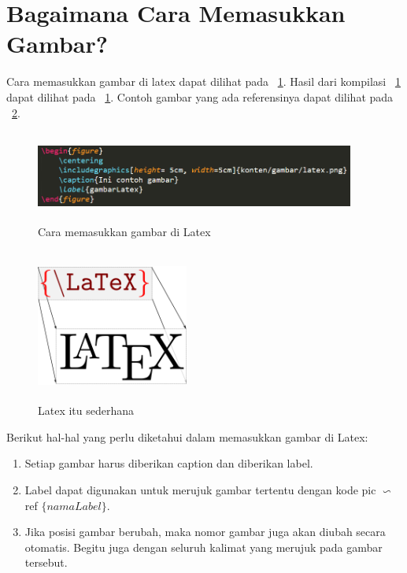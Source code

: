 \section{Bagaimana Cara Memasukkan Gambar?}
Cara memasukkan gambar di latex dapat dilihat pada \pic~\ref{gambarA}. Hasil dari kompilasi \pic~\ref{gambarA} dapat dilihat pada \pic~\ref{gambarA}. Contoh gambar yang ada referensinya dapat dilihat pada \pic~\ref{gambarB}.

\begin{figure}
	\centering
	\includegraphics[height= 3cm, width=10.5cm]{konten/gambar/contohGambar.png}
	\caption{Cara memasukkan gambar di Latex}
	\label{gambarA}
\end{figure}

\begin{figure}
	\centering
	\includegraphics[height= 5cm, width=5cm]{konten/gambar/latex.png}
	\caption{Latex itu sederhana \protect\cite{arfajsyah2018sistem}}
	\label{gambarB}
\end{figure}


Berikut hal-hal yang perlu diketahui dalam memasukkan gambar di Latex: 

\begin{enumerate}
	\item Setiap gambar harus diberikan caption dan diberikan label. 
	\item Label dapat digunakan untuk merujuk gambar tertentu dengan kode \bslash pic $\backsim$ \bslash ref $\lbrace namaLabel \rbrace$.
	\item Jika posisi gambar berubah, maka nomor gambar juga akan diubah secara 
otomatis. Begitu juga dengan seluruh kalimat yang merujuk pada gambar tersebut.
\end{enumerate}

